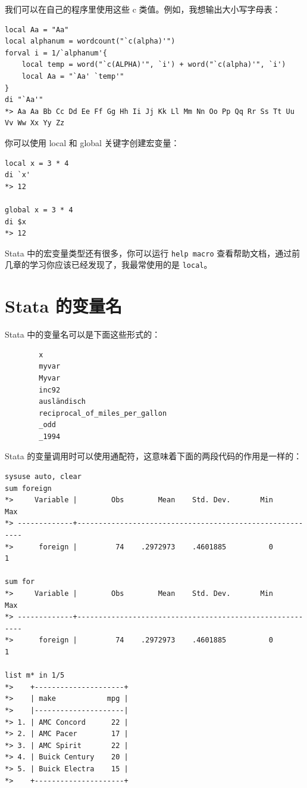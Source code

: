 我们可以在自己的程序里使用这些 c 类值。例如，我想输出大小写字母表：

\begin{lstlisting}
local Aa = "Aa"
local alphanum = wordcount("`c(alpha)'")
forval i = 1/`alphanum'{
    local temp = word("`c(ALPHA)'", `i') + word("`c(alpha)'", `i')
    local Aa = "`Aa' `temp'"
}
di "`Aa'"
*> Aa Aa Bb Cc Dd Ee Ff Gg Hh Ii Jj Kk Ll Mm Nn Oo Pp Qq Rr Ss Tt Uu Vv Ww Xx Yy Zz
\end{lstlisting}

你可以使用 local 和 global 关键字创建宏变量：

\begin{lstlisting}
local x = 3 * 4
di `x'
*> 12

global x = 3 * 4
di $x
*> 12
\end{lstlisting}

Stata 中的宏变量类型还有很多，你可以运行 \lstinline{help macro} 查看帮助文档，通过前几章的学习你应该已经发现了，我最常使用的是 \lstinline{local}。

\section{Stata 的变量名}

Stata 中的变量名可以是下面这些形式的：

\begin{lstlisting}
        x
        myvar
        Myvar
        inc92
        ausländisch
        reciprocal_of_miles_per_gallon
        _odd
        _1994
\end{lstlisting}

Stata 的变量调用时可以使用通配符，这意味着下面的两段代码的作用是一样的：

\begin{lstlisting}
sysuse auto, clear
sum foreign
*>     Variable |        Obs        Mean    Std. Dev.       Min        Max
*> -------------+---------------------------------------------------------
*>      foreign |         74    .2972973    .4601885          0          1

sum for
*>     Variable |        Obs        Mean    Std. Dev.       Min        Max
*> -------------+---------------------------------------------------------
*>      foreign |         74    .2972973    .4601885          0          1

list m* in 1/5
*>    +---------------------+
*>    | make            mpg |
*>    |---------------------|
*> 1. | AMC Concord      22 |
*> 2. | AMC Pacer        17 |
*> 3. | AMC Spirit       22 |
*> 4. | Buick Century    20 |
*> 5. | Buick Electra    15 |
*>    +---------------------+
\end{lstlisting}

